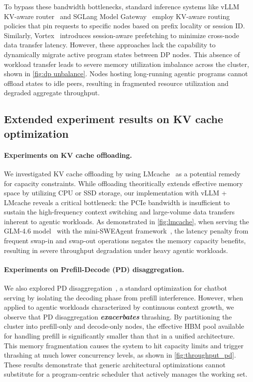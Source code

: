 To bypass these bandwidth bottlenecks, standard inference systems like vLLM KV-aware router~\citep{vllm_kvaware_routing} and SGLang Model Gateway~\citep{zheng2024sglangefficientexecutionstructured} employ KV-aware routing policies that pin requests to specific nodes based on prefix locality or session ID. Similarly, Vortex~\citep{yuan2025vortexovercomingmemorycapacity} introduces session-aware prefetching to minimize cross-node data transfer latency. However, these approaches lack the capability to dynamically migrate active program states between DP nodes. This absence of workload transfer leads to severe memory utilization imbalance across the cluster, shown in \autoref{fig:dp unbalance}. Nodes hosting long-running agentic programs cannot offload states to idle peers, resulting in fragmented resource utilization and degraded aggregate throughput.

\subsection{Extended experiment results on KV cache optimization}
\label{sec: pd+offload}
\paragraph{Experiments on KV cache offloading.}
We investigated KV cache offloading by using LMcache~\cite{liu2025lmcacheefficientkvcache} as a potential remedy for capacity constraints. While offloading theoritically extends effective memory space by utilizing CPU or SSD storage, our implementation with vLLM + LMcache reveals a critical bottleneck: the PCIe bandwidth is insufficient to sustain the high-frequency context switching and large-volume data transfers inherent to agentic workloads. As demonstrated in \autoref{fig:lmcache}, when serving the GLM-4.6 model~\cite{5team2025glm45agenticreasoningcoding} with the mini-SWEAgent framework~\cite{yang2024sweagentagentcomputerinterfacesenable}, the latency penalty from frequent swap-in and swap-out operations negates the memory capacity benefits, resulting in severe throughput degradation under heavy agentic workloads.

\paragraph{Experiments on Prefill-Decode (PD) disaggregation.}
We also explored PD disaggregation~\cite{zhong2024distservedisaggregatingprefilldecoding}, a standard optimization for chatbot serving by isolating the decoding phase from prefill interference. However, when applied to agentic workloads characterized by continuous context growth, we observe that PD disaggregation \textbf{\textit{exacerbates}} thrashing. By partitioning the cluster into prefill-only and decode-only nodes, the effective HBM pool available for handling prefill is significantly smaller than that in a unified architecture. This memory fragmentation causes the system to hit capacity limits and trigger thrashing at much lower concurrency levels, as shown in \autoref{fig:throughput_pd}. These results demonstrate that generic architectural optimizations cannot substitute for a program-centric scheduler that actively manages the working set.

